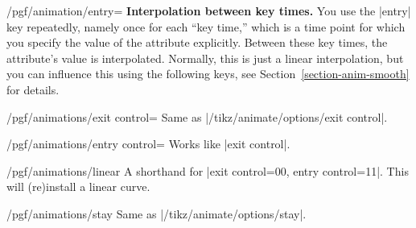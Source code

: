 \begin{key}{/pgf/animation/entry=}
    \medskip
    \textbf{Interpolation between key times.}
    You use the |entry| key repeatedly, namely once for each ``key time,''
    which is a time point for which you specify the value of the attribute
    explicitly. Between these key times, the attribute's value is interpolated.
    Normally, this is just a linear interpolation, but you can influence this
    using the following keys, see Section~\ref{section-anim-smooth} for
    details.

    \begin{key}{/pgf/animations/exit control=}
        Same as |/tikz/animate/options/exit control|.
\begin{codeexample}[animation list={0.333/\frac{1}{3},0.666/\frac{2}{3},1,1.333/1\frac{1}{3},1.666/1\frac{2}{3}}]
\end{codeexample}
    \end{key}

    \begin{key}{/pgf/animations/entry control=}
        Works like |exit control|.
    \end{key}

    \begin{key}{/pgf/animations/linear}
        A shorthand for |exit control={0}{0}, entry control={1}{1}|. This will
        (re)install a linear curve.
    \end{key}

    \begin{key}{/pgf/animations/stay}
        Same as |/tikz/animate/options/stay|.
\begin{codeexample}[animation list={0.5,1,1.5,2,2.5}]
\end{codeexample}
    \end{key}


\end{key}
